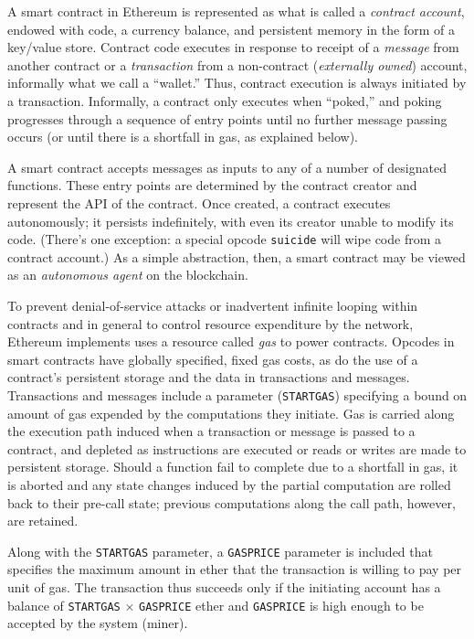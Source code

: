 A smart contract in Ethereum is represented as what is called a \emph{contract account}, endowed with code, a currency balance, and persistent memory in the form of a key/value store. Contract code executes in response to receipt of a \emph{message} from another contract or a \emph{transaction} from a non-contract (\emph{externally owned}) account, informally what we call a ``wallet.'' Thus, contract execution is always initiated by a transaction. Informally, a contract only executes when ``poked,'' and poking progresses through a sequence of entry points until no further message passing occurs (or until there is a shortfall in gas, as explained below).

A smart contract accepts messages as inputs to any of a number of designated functions. These entry points are determined by the contract creator and represent the API of the contract. Once created, a contract executes autonomously; it persists indefinitely, with even its creator unable to modify its code. (There's one exception: a special opcode \texttt{suicide} will wipe code from a contract account.) As a simple abstraction, then, a smart contract may be viewed as an {\em autonomous agent} on the blockchain. 

To prevent denial-of-service attacks or inadvertent infinite looping within contracts and in general to control resource expenditure by the network, Ethereum implements uses a resource called \emph{gas} to power contracts. Opcodes in smart contracts have globally specified, fixed gas costs, as do the use of a contract's persistent storage and the data in transactions and messages. Transactions and messages include a parameter (\texttt{STARTGAS}) specifying a bound on amount of gas expended by the computations they initiate. Gas is carried along the execution path induced when a transaction or message is passed to a contract, and depleted as instructions are executed or reads or writes are made to persistent storage. Should a function fail to complete due to a shortfall in gas, it is aborted and any state changes induced by the partial computation are rolled back to their pre-call state; previous computations along the call path, however, are retained. 

Along with the \texttt{STARTGAS} parameter, a \texttt{GASPRICE} parameter is included that specifies the maximum amount in ether that the transaction is willing to pay per unit of gas. The transaction thus succeeds only if the initiating account has a balance of \texttt{STARTGAS} $\times$ \texttt{GASPRICE} ether and \texttt{GASPRICE} is high enough to be accepted by the system (miner). 

